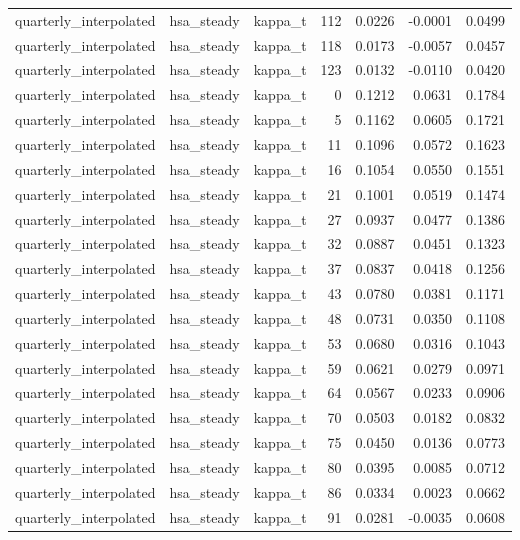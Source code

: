 \begin{tabular}{lllrrrr}
quarterly\_interpolated & hsa\_steady & kappa\_t & 112 & 0.0226 & -0.0001 & 0.0499 \\
quarterly\_interpolated & hsa\_steady & kappa\_t & 118 & 0.0173 & -0.0057 & 0.0457 \\
quarterly\_interpolated & hsa\_steady & kappa\_t & 123 & 0.0132 & -0.0110 & 0.0420 \\
quarterly\_interpolated & hsa\_steady & kappa\_t & 0 & 0.1212 & 0.0631 & 0.1784 \\
quarterly\_interpolated & hsa\_steady & kappa\_t & 5 & 0.1162 & 0.0605 & 0.1721 \\
quarterly\_interpolated & hsa\_steady & kappa\_t & 11 & 0.1096 & 0.0572 & 0.1623 \\
quarterly\_interpolated & hsa\_steady & kappa\_t & 16 & 0.1054 & 0.0550 & 0.1551 \\
quarterly\_interpolated & hsa\_steady & kappa\_t & 21 & 0.1001 & 0.0519 & 0.1474 \\
quarterly\_interpolated & hsa\_steady & kappa\_t & 27 & 0.0937 & 0.0477 & 0.1386 \\
quarterly\_interpolated & hsa\_steady & kappa\_t & 32 & 0.0887 & 0.0451 & 0.1323 \\
quarterly\_interpolated & hsa\_steady & kappa\_t & 37 & 0.0837 & 0.0418 & 0.1256 \\
quarterly\_interpolated & hsa\_steady & kappa\_t & 43 & 0.0780 & 0.0381 & 0.1171 \\
quarterly\_interpolated & hsa\_steady & kappa\_t & 48 & 0.0731 & 0.0350 & 0.1108 \\
quarterly\_interpolated & hsa\_steady & kappa\_t & 53 & 0.0680 & 0.0316 & 0.1043 \\
quarterly\_interpolated & hsa\_steady & kappa\_t & 59 & 0.0621 & 0.0279 & 0.0971 \\
quarterly\_interpolated & hsa\_steady & kappa\_t & 64 & 0.0567 & 0.0233 & 0.0906 \\
quarterly\_interpolated & hsa\_steady & kappa\_t & 70 & 0.0503 & 0.0182 & 0.0832 \\
quarterly\_interpolated & hsa\_steady & kappa\_t & 75 & 0.0450 & 0.0136 & 0.0773 \\
quarterly\_interpolated & hsa\_steady & kappa\_t & 80 & 0.0395 & 0.0085 & 0.0712 \\
quarterly\_interpolated & hsa\_steady & kappa\_t & 86 & 0.0334 & 0.0023 & 0.0662 \\
quarterly\_interpolated & hsa\_steady & kappa\_t & 91 & 0.0281 & -0.0035 & 0.0608 \\

\end{tabular}

